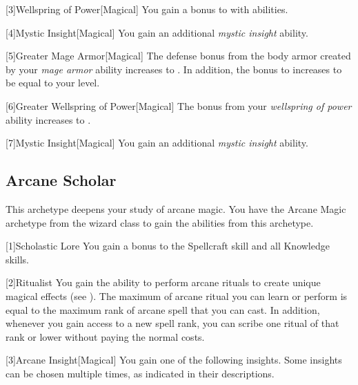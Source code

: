         [3]{Wellspring of Power}[Magical]
        You gain a  bonus to  with  abilities.

        [4]{Mystic Insight}[Magical]
        You gain an additional \textit{mystic insight} ability.

        [5]{Greater Mage Armor}[Magical]
        The defense bonus from the body armor created by your \textit{mage armor} ability increases to .
        In addition, the bonus to  increases to be equal to your level.

        [6]{Greater Wellspring of Power}[Magical]
        The bonus from your \textit{wellspring of power} ability increases to .

        [7]{Mystic Insight}[Magical]
        You gain an additional \textit{mystic insight} ability.

    \subsection{Arcane Scholar}
        This archetype deepens your study of arcane magic.
        You have the Arcane Magic archetype from the wizard class to gain the abilities from this archetype.

        [1]{Scholastic Lore} You gain a  bonus to the Spellcraft skill and all Knowledge skills.

        [2]{Ritualist} You gain the ability to perform arcane rituals to create unique magical effects (see ).
        The maximum  of arcane ritual you can learn or perform is equal to the maximum rank of arcane spell that you can cast.
        In addition, whenever you gain access to a new spell rank, you can scribe one ritual of that rank or lower without paying the normal costs.

        [3]{Arcane Insight}[Magical]
        You gain one of the following insights.
        Some insights can be chosen multiple times, as indicated in their descriptions.

